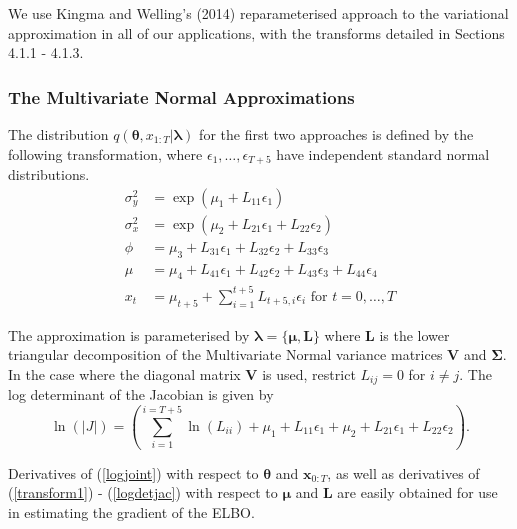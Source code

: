 \documentclass[12pt,a4paper]{article}%
\numberwithin{equation}{section}
\begin{document}
We use Kingma and Welling's (2014) reparameterised approach to the variational approximation in all of our applications, with the transforms detailed in Sections 4.1.1 - 4.1.3.

\subsubsection{The Multivariate Normal Approximations}

The distribution $q(\boldsymbol{\theta}, x_{1:T} | \boldsymbol{\lambda})$ for the first two approaches is defined by the following transformation, where $\epsilon_{1}, \dots, \epsilon_{T+5}$ have independent standard normal distributions.
\begin{align}
\sigma^2_y &= \exp(\mu_1 + L_{11} \epsilon_1)  \label{transform1} \\
\sigma^2_x &= \exp(\mu_2 + L_{21} \epsilon_1 + L_{22} \epsilon_2) \label{transform2} \\
\phi &= \mu_3 + L_{31} \epsilon_1 + L_{32} \epsilon_2 + L_{33} \epsilon_3 \label{transform3} \\
\mu &= \mu_4 + L_{41} \epsilon_1 + L_{42} \epsilon_2 + L_{43} \epsilon_3 + L_{44} \epsilon_4 \label{transform4} \\
x_t &= \mu_{t+5} + \sum_{i=1}^{t+5} L_{t+5, i} \epsilon_i \mbox{ for } t = 0, \dots, T \label{transform5} 
\end{align}

The approximation is parameterised by $\boldsymbol{\lambda} = \{ \boldsymbol{\mu}, \textbf{L} \}$ where $\textbf{L}$ is the lower triangular decomposition of the Multivariate Normal variance matrices $\textbf{V}$ and $\boldsymbol{\Sigma}$. In the case where the diagonal matrix $\textbf{V}$ is used, restrict $L_{ij} = 0$ for $i \neq j$.
The log determinant of the Jacobian is given by
\begin{equation}
\label{logdetjac}
\ln(|J|) = \left(\sum_{i = 1}^{i = T+5} \ln(L_{ii}) + \mu_1 + L_{11} \epsilon_1 + \mu_2 + L_{21} \epsilon_1 + L_{22} \epsilon_2\right).  
\end{equation}

Derivatives of (\ref{logjoint}) with respect to $\boldsymbol{\theta}$ and $\textbf{x}_{0:T}$, as well as derivatives of (\ref{transform1}) - (\ref{logdetjac}) with respect to $\boldsymbol{\mu}$ and $\textbf{L}$ are easily obtained for use in estimating the gradient of the ELBO.
\end{document}
